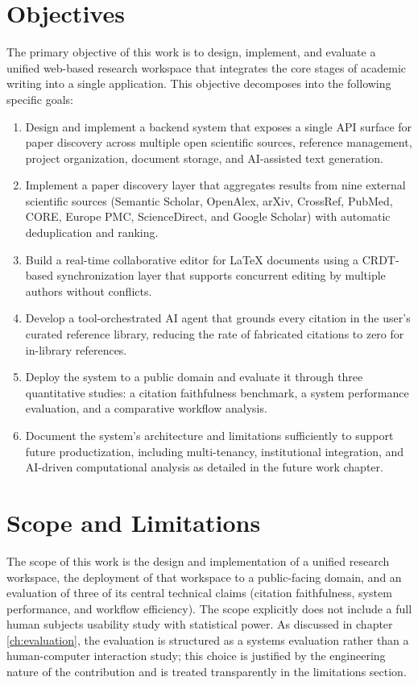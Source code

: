 \section{Objectives}
\label{sec:objectives}

The primary objective of this work is to design, implement, and evaluate a unified web-based research workspace that integrates the core stages of academic writing into a single application. This objective decomposes into the following specific goals:

\begin{enumerate}
    \item Design and implement a backend system that exposes a single API surface for paper discovery across multiple open scientific sources, reference management, project organization, document storage, and AI-assisted text generation.
    \item Implement a paper discovery layer that aggregates results from nine external scientific sources (Semantic Scholar, OpenAlex, arXiv, CrossRef, PubMed, CORE, Europe PMC, ScienceDirect, and Google Scholar) with automatic deduplication and ranking.
    \item Build a real-time collaborative editor for LaTeX documents using a CRDT-based synchronization layer that supports concurrent editing by multiple authors without conflicts.
    \item Develop a tool-orchestrated AI agent that grounds every citation in the user's curated reference library, reducing the rate of fabricated citations to zero for in-library references.
    \item Deploy the system to a public domain and evaluate it through three quantitative studies: a citation faithfulness benchmark, a system performance evaluation, and a comparative workflow analysis.
    \item Document the system's architecture and limitations sufficiently to support future productization, including multi-tenancy, institutional integration, and AI-driven computational analysis as detailed in the future work chapter.
\end{enumerate}

\section{Scope and Limitations}
\label{sec:scope}

The scope of this work is the design and implementation of a unified research workspace, the deployment of that workspace to a public-facing domain, and an evaluation of three of its central technical claims (citation faithfulness, system performance, and workflow efficiency). The scope explicitly does not include a full human subjects usability study with statistical power. As discussed in chapter \ref{ch:evaluation}, the evaluation is structured as a systems evaluation rather than a human-computer interaction study; this choice is justified by the engineering nature of the contribution and is treated transparently in the limitations section.

